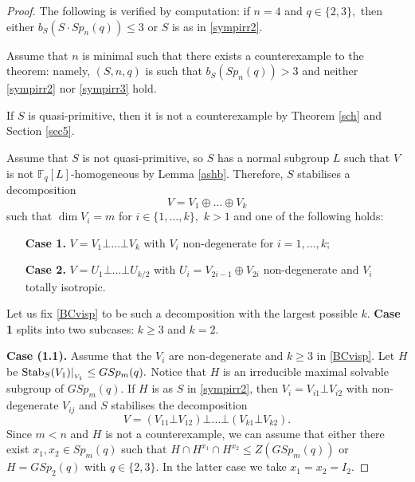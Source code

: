 \begin{proof}
The following is verified by computation: if $n=4$ and $q \in \{2,3\},$ then either $b_S(S \cdot Sp_n(q)) \le 3$ or $S$ is as in \eqref{sympirr2}.

Assume that $n$ is minimal such that there exists a counterexample to the theorem: namely,  $(S,n,q)$  is such that  $b_S(Sp_n(q))>3$ and neither  \eqref{sympirr2} nor \eqref{sympirr3}  hold.

If $S$ is quasi-primitive, then it is not a counterexample by Theorem \ref{sch} and Section \ref{sec5}.

 Assume that $S$ is not quasi-primitive, so $S$ has a normal subgroup $L$ such that $V$ is not $\mathbb{F}_q[L]$-homogeneous by Lemma \ref{ashb}. Therefore, $S$ stabilises a decomposition 
\begin{equation}
\label{BCvisp}
V=V_1 \oplus \ldots \oplus V_k
\end{equation}
such that $\dim V_i=m$ for $i \in \{1, \ldots, k\},$ $k>1$ and one of the following holds:
\begin{itemize}
\item[{\bf Case 1.}] $V=V_1 \bot \ldots \bot V_k$ with $V_i$ non-degenerate for $i=1, \ldots, k;$
\item[{\bf Case 2.}] $V=U_1 \bot \ldots \bot U_{k/2}$ with $U_i=V_{2i-1} \oplus V_{2i}$ non-degenerate and $V_i$ totally isotropic. 
\end{itemize} Let us fix \eqref{BCvisp} to be such a decomposition with
the largest possible $k$.   {\bf Case 1} splits into two subcases: $k \ge 3$ and $k=2$. 

\medskip

{\bf Case (1.1).} Assume that the $V_i$ are non-degenerate and $k\ge 3$ in \eqref{BCvisp}. Let $H$ be $\mathrm{Stab}_S(V_1)|_{_{V_1}} \le GSp_m(q).$ Notice that $H$ is an irreducible maximal solvable  subgroup of $GSp_m(q).$ If $H$ is as $S$ in \eqref{sympirr2}, then $V_i = V_{i1} \bot V_{i2}$ with non-degenerate $V_{ij}$ and $S$ stabilises the decomposition $$V=(V_{11} \bot V_{12}) \bot \ldots \bot (V_{k1} \bot V_{k2}).$$   Since $m<n$ and $H$ is not a counterexample, we can assume that either there exist $x_1, x_2 \in Sp_m(q)$ such that $H \cap H^{x_1} \cap H^{x_2} \le Z(GSp_m(q))$ or  $H=GSp_2(q)$ with $q \in \{2,3\}$. In the latter case we take $x_1=x_2=I_2.$ 


\end{proof}
